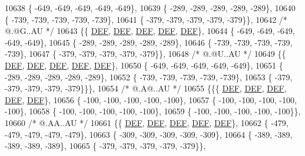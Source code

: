 \begin{DoxyCode}
10638 \{ -649, -649, -649, -649, -649\},
10639 \{ -289, -289, -289, -289, -289\},
10640 \{ -739, -739, -739, -739, -739\},
10641 \{ -379, -379, -379, -379, -379\}\},
10642 \textcolor{comment}{/*  @.@G..AU */}
10643 \{\{  \mbox{\hyperlink{1_88_84__epars_8h_a397419fc12b37ed479c8abb9d444d843}{DEF}},  \mbox{\hyperlink{1_88_84__epars_8h_a397419fc12b37ed479c8abb9d444d843}{DEF}},  \mbox{\hyperlink{1_88_84__epars_8h_a397419fc12b37ed479c8abb9d444d843}{DEF}},  \mbox{\hyperlink{1_88_84__epars_8h_a397419fc12b37ed479c8abb9d444d843}{DEF}},  \mbox{\hyperlink{1_88_84__epars_8h_a397419fc12b37ed479c8abb9d444d843}{DEF}}\},
10644 \{ -649, -649, -649, -649, -649\},
10645 \{ -289, -289, -289, -289, -289\},
10646 \{ -739, -739, -739, -739, -739\},
10647 \{ -379, -379, -379, -379, -379\}\},
10648 \textcolor{comment}{/*  @.@U..AU */}
10649 \{\{  \mbox{\hyperlink{1_88_84__epars_8h_a397419fc12b37ed479c8abb9d444d843}{DEF}},  \mbox{\hyperlink{1_88_84__epars_8h_a397419fc12b37ed479c8abb9d444d843}{DEF}},  \mbox{\hyperlink{1_88_84__epars_8h_a397419fc12b37ed479c8abb9d444d843}{DEF}},  \mbox{\hyperlink{1_88_84__epars_8h_a397419fc12b37ed479c8abb9d444d843}{DEF}},  \mbox{\hyperlink{1_88_84__epars_8h_a397419fc12b37ed479c8abb9d444d843}{DEF}}\},
10650 \{ -649, -649, -649, -649, -649\},
10651 \{ -289, -289, -289, -289, -289\},
10652 \{ -739, -739, -739, -739, -739\},
10653 \{ -379, -379, -379, -379, -379\}\}\},
10654 \textcolor{comment}{/*  @.A@..AU */}
10655 \{\{\{  \mbox{\hyperlink{1_88_84__epars_8h_a397419fc12b37ed479c8abb9d444d843}{DEF}},  \mbox{\hyperlink{1_88_84__epars_8h_a397419fc12b37ed479c8abb9d444d843}{DEF}},  \mbox{\hyperlink{1_88_84__epars_8h_a397419fc12b37ed479c8abb9d444d843}{DEF}},  \mbox{\hyperlink{1_88_84__epars_8h_a397419fc12b37ed479c8abb9d444d843}{DEF}},  \mbox{\hyperlink{1_88_84__epars_8h_a397419fc12b37ed479c8abb9d444d843}{DEF}}\},
10656 \{ -100, -100, -100, -100, -100\},
10657 \{ -100, -100, -100, -100, -100\},
10658 \{ -100, -100, -100, -100, -100\},
10659 \{ -100, -100, -100, -100, -100\}\},
10660 \textcolor{comment}{/*  @.AA..AU */}
10661 \{\{  \mbox{\hyperlink{1_88_84__epars_8h_a397419fc12b37ed479c8abb9d444d843}{DEF}},  \mbox{\hyperlink{1_88_84__epars_8h_a397419fc12b37ed479c8abb9d444d843}{DEF}},  \mbox{\hyperlink{1_88_84__epars_8h_a397419fc12b37ed479c8abb9d444d843}{DEF}},  \mbox{\hyperlink{1_88_84__epars_8h_a397419fc12b37ed479c8abb9d444d843}{DEF}},  \mbox{\hyperlink{1_88_84__epars_8h_a397419fc12b37ed479c8abb9d444d843}{DEF}}\},
10662 \{ -479, -479, -479, -479, -479\},
10663 \{ -309, -309, -309, -309, -309\},
10664 \{ -389, -389, -389, -389, -389\},
10665 \{ -379, -379, -379, -379, -379\}\},

\end{DoxyCode}
